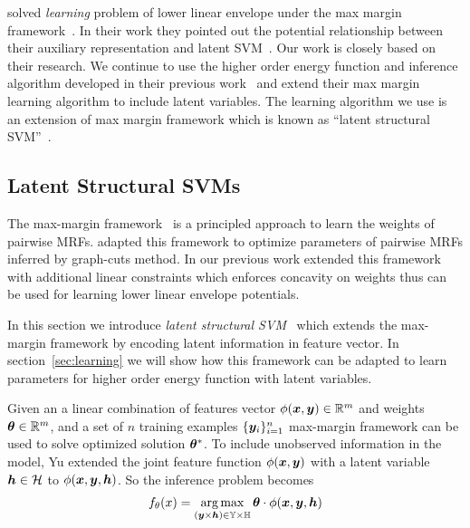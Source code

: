  solved \emph{learning} problem of lower
linear envelope under the max margin
framework~\cite{tsochantaridis2005large}. In their work they
pointed out the potential relationship between their auxiliary
representation and latent SVM~\cite{yu2009learning}. Our work is
closely based on their research. We continue to use the higher
order energy function and inference algorithm developed in their
previous work~\cite{Gould:ICML2011} and extend their max margin
learning algorithm to include latent variables. The learning
algorithm we use is an extension of max margin framework which is
known as ``latent structural SVM''~\cite{yu2009learning}.

\subsection{Latent Structural SVMs}
\label{sec:latent-struct-svms}

The max-margin
framework~\cite{Taskar:ICML05,tsochantaridis2005large} is a
principled approach to learn the weights of pairwise MRFs.
 adapted this framework to optimize
parameters of pairwise MRFs inferred by graph-cuts method. In our
previous work  extended this framework
with additional linear constraints which enforces concavity on
weights thus can be used for learning lower linear envelope
potentials.

In this section we introduce \emph{latent structural
  SVM}~\cite{yu2009learning} which extends the max-margin
framework by encoding latent information in feature vector. In
section~\ref{sec:learning} we will show how this framework can be
adapted to learn parameters for higher order energy function with
latent variables.

Given an a linear combination of features vector $\phi({\bm{x}} ,{\bm{y}})
\in {\mathbb{R}}^m$ and weights ${\bm{\theta}} \in {\mathbb{R}}^m$, and a set of
$n$ training examples $\{{\bm{y}}_i\}_{i=1}^n$ max-margin framework
can be used to solve optimized solution ${\bm{\theta}}^*$. To include
unobserved information in the model, Yu\cite{yu2009learning}
extended the joint feature function\cite{tsochantaridis2005large}
$\phi({\bm{x}},{\bm{y}}) $ with a latent variable
${\bm{h}}\in \mathcal{H}$ to
$\phi({\bm{x}},{\bm{y}},{\bm{h}}) $. So the inference
problem becomes
\begin{align}
  \label{eq:latent_ssvm_linearcomb}
  f_\theta(x) = \operatorname*{arg\,max}_{({\bm{y}} \times {\bm{h}}) \in {\mathbb{Y}}
  \times {\mathbb{H}}} {\bm{\theta}}\cdot\phi({\bm{x}},{\bm{y}},{\bm{h}})
\end{align}

